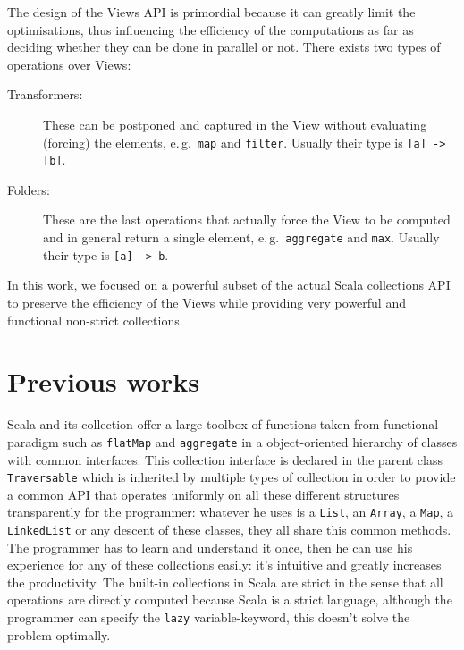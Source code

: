\documentclass[a4paper,12pt,twocolumn]{article}
\newcommand{\eg}{e.\,g.\ }
\begin{document}
The design of the Views API is primordial because it can greatly limit the optimisations, thus influencing the efficiency of the computations as far as deciding whether they can be done in parallel or not.
There exists two types of operations over Views:
\begin{description}
    \item[Transformers:] These can be postponed and captured in the View without evaluating (forcing) the elements, \eg \verb|map| and \verb|filter|. Usually their type is \verb|[a] -> [b]|.
    \item[Folders:] These are the last operations that actually force the View to be computed and in general return a single element, \eg \verb|aggregate| and \verb|max|. Usually their type is \verb|[a] -> b|.
\end{description}
In this work, we focused on a powerful subset of the actual Scala collections API to preserve the efficiency of the Views while providing very powerful and functional non-strict collections.

\section{Previous works}
Scala and its collection offer a large toolbox of functions taken from functional paradigm such as \verb|flatMap| and \verb|aggregate| in a object-oriented hierarchy of classes with common interfaces.
This collection interface is declared in the parent class \verb|Traversable|\cite{scala-collections} which is inherited by multiple types of collection in order to provide a common API that operates uniformly on all these different structures transparently for the programmer: whatever he uses is a \verb|List|, an \verb|Array|, a \verb|Map|, a \verb|LinkedList| or any descent of these classes, they all share this common methods.
The programmer has to learn and understand it once, then he can use his experience for any of these collections easily: it's intuitive and greatly increases the productivity.
The built-in collections in Scala are strict in the sense that all operations are directly computed because Scala is a strict language, although the programmer can specify the \verb|lazy| variable-keyword, this doesn't solve the problem optimally.
\end{document}
